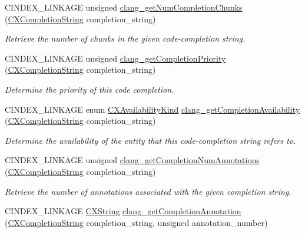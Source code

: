 \begin{DoxyCompactItemize}
C\+I\+N\+D\+E\+X\+\_\+\+L\+I\+N\+K\+A\+GE unsigned \mbox{\hyperlink{group__CINDEX__CODE__COMPLET_ga76018aa1a7225268546e4d75dca5dbce}{clang\+\_\+get\+Num\+Completion\+Chunks}} (\mbox{\hyperlink{group__CINDEX__CODE__COMPLET_gafea23a43a60ec3b4f3bedccfbb76883a}{C\+X\+Completion\+String}} completion\+\_\+string)
\begin{DoxyCompactList}\small\item\em Retrieve the number of chunks in the given code-\/completion string. \end{DoxyCompactList}\item 
C\+I\+N\+D\+E\+X\+\_\+\+L\+I\+N\+K\+A\+GE unsigned \mbox{\hyperlink{group__CINDEX__CODE__COMPLET_ga46e843acdf63d9a7a0c7341a2d222c49}{clang\+\_\+get\+Completion\+Priority}} (\mbox{\hyperlink{group__CINDEX__CODE__COMPLET_gafea23a43a60ec3b4f3bedccfbb76883a}{C\+X\+Completion\+String}} completion\+\_\+string)
\begin{DoxyCompactList}\small\item\em Determine the priority of this code completion. \end{DoxyCompactList}\item 
C\+I\+N\+D\+E\+X\+\_\+\+L\+I\+N\+K\+A\+GE enum \mbox{\hyperlink{group__CINDEX_gada331ea0195e952c8f181ecf15e83d71}{C\+X\+Availability\+Kind}} \mbox{\hyperlink{group__CINDEX__CODE__COMPLET_gacbbded5dd9c27b927ed5080d8b530845}{clang\+\_\+get\+Completion\+Availability}} (\mbox{\hyperlink{group__CINDEX__CODE__COMPLET_gafea23a43a60ec3b4f3bedccfbb76883a}{C\+X\+Completion\+String}} completion\+\_\+string)
\begin{DoxyCompactList}\small\item\em Determine the availability of the entity that this code-\/completion string refers to. \end{DoxyCompactList}\item 
C\+I\+N\+D\+E\+X\+\_\+\+L\+I\+N\+K\+A\+GE unsigned \mbox{\hyperlink{group__CINDEX__CODE__COMPLET_gadce9960ed8d554f497eda0457a3d52f9}{clang\+\_\+get\+Completion\+Num\+Annotations}} (\mbox{\hyperlink{group__CINDEX__CODE__COMPLET_gafea23a43a60ec3b4f3bedccfbb76883a}{C\+X\+Completion\+String}} completion\+\_\+string)
\begin{DoxyCompactList}\small\item\em Retrieve the number of annotations associated with the given completion string. \end{DoxyCompactList}\item 
C\+I\+N\+D\+E\+X\+\_\+\+L\+I\+N\+K\+A\+GE \mbox{\hyperlink{structCXString}{C\+X\+String}} \mbox{\hyperlink{group__CINDEX__CODE__COMPLET_ga5a6995822b664926ac3d919d69e736ce}{clang\+\_\+get\+Completion\+Annotation}} (\mbox{\hyperlink{group__CINDEX__CODE__COMPLET_gafea23a43a60ec3b4f3bedccfbb76883a}{C\+X\+Completion\+String}} completion\+\_\+string, unsigned annotation\+\_\+number)

\end{DoxyCompactItemize}
